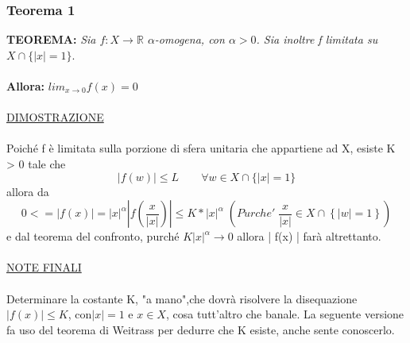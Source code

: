 \documentclass[fontsize = 20px, paper = a4]{article}
\begin{document}
\subsubsection{Teorema 1}
\textbf{TEOREMA: } \emph{Sia $f:X\rightarrow \mathbb{R}$ $\alpha$-omogena, con $\alpha > 0$. Sia inoltre f limitata su }\\ 
\hspace*{2.3cm} \emph{$X \cap \{| x | = 1\}$}.\\ \\
\textbf{Allora: }$lim_{x \to 0} f(x) = 0$\\ \\
\underline{DIMOSTRAZIONE }\\ \\
Poiché f è limitata sulla porzione di sfera unitaria che appartiene ad X, esiste K > 0 tale che 
$$| f(w) | \le L \qquad \forall w \in X \cap \{ | x | = 1 \}$$
allora da 
$$0 <= | f(x) | = | x |^\alpha | f \left( \frac{x}{| x | } \right )| \le K* | x |^\alpha \; (Purche' \; \frac{x}{|x|} \in X \cap \left \{ |w| = 1 \right \})$$
e dal teorema del confronto, purché $K|x|^\alpha \rightarrow 0$ allora | f(x) | farà altrettanto.\\ \\
\underline{NOTE FINALI} \\ \\
Determinare la costante K, "a mano",che dovrà risolvere la disequazione  $| f(x) | \le  K $, con$ | x | = 1$
e $x \in X$, cosa tutt'altro che banale. La seguente versione fa uso del teorema di Weitrass per dedurre che K esiste, anche sente conoscerlo.
\end{document}
